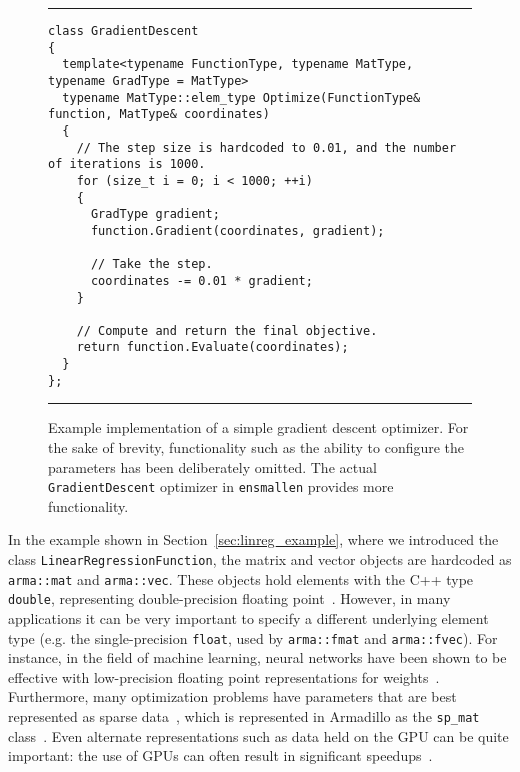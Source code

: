 \begin{figure}[t!]
\hrule
\vspace{1ex}
\begin{verbatim}
class GradientDescent
{
  template<typename FunctionType, typename MatType, typename GradType = MatType>
  typename MatType::elem_type Optimize(FunctionType& function, MatType& coordinates)
  {
    // The step size is hardcoded to 0.01, and the number of iterations is 1000.
    for (size_t i = 0; i < 1000; ++i)
    {
      GradType gradient;
      function.Gradient(coordinates, gradient);

      // Take the step.
      coordinates -= 0.01 * gradient;
    }

    // Compute and return the final objective.
    return function.Evaluate(coordinates);
  }
};
\end{verbatim}
\hrule
\vspace*{-0.5em}
\caption{Example implementation of a simple gradient descent optimizer.
For the sake of brevity, functionality such as the ability to configure the parameters has
been deliberately omitted.
The actual {\tt GradientDescent} optimizer in {\tt ensmallen} provides more functionality.
}

\label{fig:gd}
\end{figure}

In the example shown in Section~\ref{sec:linreg_example},
where we introduced the class {\tt LinearRegressionFunction},
the matrix and vector objects are hardcoded as {\tt arma::mat} and {\tt arma::vec}.
These objects hold elements with the C++ type {\tt double},
representing double-precision floating point~\cite{Goldberg_CSUR_1991}.
However, in many applications it can be very important to specify a different
underlying element type (e.g. the single-precision {\tt float}, used by {\tt arma::fmat} and {\tt arma::fvec}).
For instance, in the field of machine learning, neural
networks have been shown to be effective with low-precision floating point
representations for weights~\cite{vanhoucke2011improving}.
Furthermore, many optimization problems have parameters
that are best represented as sparse data~\cite{van2011sparse, recht2011hogwild},
which is represented in Armadillo as the {\tt sp\_mat} class~\cite{sanderson2018user, mca24030070}.
Even alternate representations such as data held on the GPU can be quite
important: the use of GPUs can often result in significant
speedups~\cite{oh2004gpu, athanasopoulos2011gpu}.


